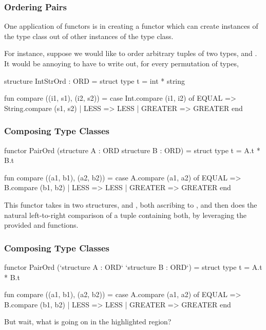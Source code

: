 \documentclass[aspectratio=169]{beamer}
\begin{document}
\begin{frame}[fragile]
  \frametitle{Ordering Pairs}

  One application of functors is in creating a functor which can create instances
  of the  type class out of other instances of the  type class.

  \pause
  \vspace{\fill}

  For instance, suppose we would like to order arbitrary tuples of two types,
   and . It would be annoying to have to write out, for every
  permutation of types,

  \pause
  \vspace{\fill}

  \begin{codeblock}
    structure IntStrOrd : ORD =
      struct
        type t = int * string

        fun compare ((i1, s1), (i2, s2)) =
          case Int.compare (i1, i2) of
            EQUAL   => String.compare (s1, s2)
          | LESS    => LESS
          | GREATER => GREATER
      end
  \end{codeblock}
\end{frame}

\begin{frame}[fragile]
  \frametitle{Composing Type Classes}

  \begin{codeblock}
    functor PairOrd (structure A : ORD
                     structure B : ORD) =
      struct
        type t = A.t * B.t

        fun compare ((a1, b1), (a2, b2)) =
          case A.compare (a1, a2) of
            EQUAL   => B.compare (b1, b2)
          | LESS    => LESS
          | GREATER => GREATER
      end
  \end{codeblock}

  \pause
  \vspace{\fill}

  This functor takes in two structures,  and , both ascribing
  to , and then does the natural left-to-right comparison of a
  tuple containing both, by leveraging the provided  and
   functions.
\end{frame}

\begin{frame}[fragile]
  \frametitle{Composing Type Classes}

  \begin{codeblock}
    functor PairOrd (`structure A : ORD`
                     `structure B : ORD`) =
      struct
        type t = A.t * B.t

        fun compare ((a1, b1), (a2, b2)) =
          case A.compare (a1, a2) of
            EQUAL   => B.compare (b1, b2)
          | LESS    => LESS
          | GREATER => GREATER
      end
  \end{codeblock}

  \pause
  \vspace{\fill}

  But wait, what is going on in the highlighted region?
\end{frame}
\end{document}
